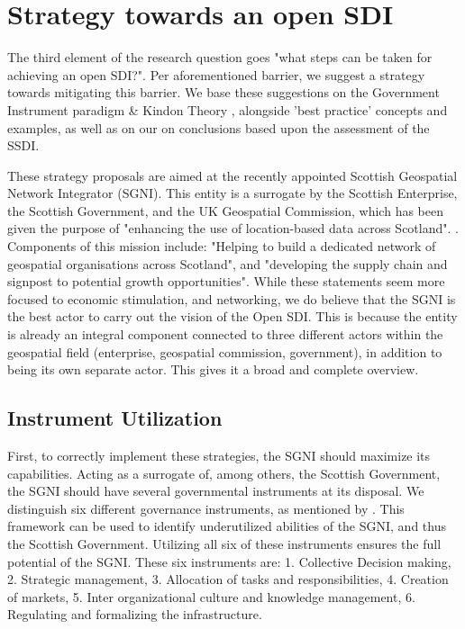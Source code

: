 \section{Strategy towards an open SDI}
The third element of the research question goes "what steps can be taken for achieving an open SDI?". Per aforementioned barrier, we suggest a strategy towards mitigating this barrier. We base these suggestions on the Government Instrument paradigm \citep{gov_instruments} \& Kindon Theory \citep{kingdon}, alongside 'best practice' concepts and examples, as well as on our on conclusions based upon the assessment of the SSDI.

These strategy proposals are aimed at the recently appointed Scottish Geospatial Network Integrator (SGNI). This entity is a surrogate by the Scottish Enterprise, the Scottish Government, and the UK Geospatial Commission, which has been given the purpose of "enhancing the use of location-based data across Scotland". \citep[]{scottish_geospatial_network_integrator}. Components of this mission include: "Helping to build a dedicated network of geospatial organisations across Scotland", and "developing the supply chain and signpost to potential growth opportunities". While these statements seem more focused to economic stimulation, and networking, we do believe that the SGNI is the best actor to carry out the vision of the Open SDI. This is because the entity is already an integral component connected to three different actors within the geospatial field (enterprise, geospatial commission, government), in addition to being its own separate actor. This gives it a broad and complete overview.


\subsection{Instrument Utilization}



First, to correctly implement these strategies, the SGNI should maximize its capabilities. Acting as a surrogate of, among others, the Scottish Government, the SGNI should have several governmental instruments at its disposal. We distinguish six different governance instruments, as mentioned by \citep{gov_instruments}. This framework can be used to identify underutilized abilities of the SGNI, and thus the Scottish Government. Utilizing all six of these instruments ensures the full potential of the SGNI. These six instruments are: 1. Collective Decision making, 2. Strategic management, 3. Allocation of tasks and responsibilities, 4. Creation of markets, 5. Inter organizational culture and knowledge management, 6. Regulating and formalizing the infrastructure.

